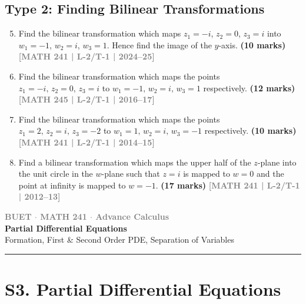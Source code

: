 \documentclass[12pt]{article}
\newcommand{\yr}[1]{\hfill\textcolor{gray}{\small\textbf{[#1]}}}
\newcommand{\mk}[1]{\textcolor{orange!70!black}{\small\textbf{(#1 marks)}}}
\newcommand{\secdivider}[3]{%
  \newpage\thispagestyle{empty}%
  \vspace*{\fill}%
  \begin{tcolorbox}[enhanced,colback=#3!6,colframe=#3,boxrule=1.5pt,arc=8pt,
    left=20pt,right=20pt,top=22pt,bottom=22pt,
    shadow={3pt}{-3pt}{0pt}{black!15}]
    \centering
    {\large\textcolor{gray}{\textbf{BUET $\cdot$ MATH 241 $\cdot$ Advance Calculus}}}\\[8pt]
    {\fontsize{26}{32}\selectfont\bfseries\textcolor{#3}{#1}}\\[6pt]
    {\fontsize{15}{19}\selectfont\textcolor{dgray}{#2}}\\[12pt]
    \textcolor{#3!60}{\rule{0.5\textwidth}{0.5pt}}
  \end{tcolorbox}%
  \vspace*{\fill}\newpage%
}
\begin{document}
\subsection*{Type 2: Finding Bilinear Transformations}

\begin{enumerate}
\setcounter{enumi}{4}

\item Find the bilinear transformation which maps $z_{1}=-i$, $z_{2}=0$, $z_{3}=i$ into $w_{1}=-1$, $w_{2}=i$, $w_{3}=1$. Hence find the image of the $y$-axis.
\mk{10} \yr{MATH 241 | L-2/T-1 | 2024--25}



\item Find the bilinear transformation which maps the points $z_{1}=-i,\,z_{2}=0,\,z_{3}=i$ to $w_{1}=-1,\,w_{2}=i,\,w_{3}=1$ respectively.
\mk{12} \yr{MATH 245 | L-2/T-1 | 2016--17}



\item Find the bilinear transformation which maps the points $z_{1}=2,\,z_{2}=i,\,z_{3}=-2$ to $w_{1}=1,\,w_{2}=i,\,w_{3}=-1$ respectively.
\mk{10} \yr{MATH 241 | L-2/T-1 | 2014--15}



\item Find a bilinear transformation which maps the upper half of the $z$-plane into the unit circle in the $w$-plane such that $z=i$ is mapped to $w=0$ and the point at infinity is mapped to $w=-1$.
\mk{17} \yr{MATH 241 | L-2/T-1 | 2012--13}



\end{enumerate}


\secdivider{Partial Differential Equations}{Formation, First \& Second Order PDE, Separation of Variables}{cC}

\section{S3. Partial Differential Equations}
\label{sec:S6}
\end{document}
